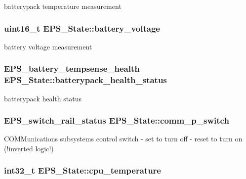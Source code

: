 batterypack temperature measurement \hypertarget{struct_e_p_s___state_a991b8e87396c3a76e3920115c165cf21}{
\subsubsection[{battery\-\_\-voltage}]{\setlength{\rightskip}{0pt plus 5cm}uint16\-\_\-t E\-P\-S\-\_\-\-State\-::battery\-\_\-voltage}}\label{struct_e_p_s___state_a991b8e87396c3a76e3920115c165cf21}
battery voltage measurement \hypertarget{struct_e_p_s___state_a8b34854a3d12dc7e7c705feb0074de76}{
\subsubsection[{batterypack\-\_\-health\-\_\-status}]{\setlength{\rightskip}{0pt plus 5cm}E\-P\-S\-\_\-battery\-\_\-tempsense\-\_\-health E\-P\-S\-\_\-\-State\-::batterypack\-\_\-health\-\_\-status}}\label{struct_e_p_s___state_a8b34854a3d12dc7e7c705feb0074de76}
batterypack health status \hypertarget{struct_e_p_s___state_addeb967b965af8a5784569eab567214c}{
\subsubsection[{comm\-\_\-p\-\_\-switch}]{\setlength{\rightskip}{0pt plus 5cm}E\-P\-S\-\_\-switch\-\_\-rail\-\_\-status E\-P\-S\-\_\-\-State\-::comm\-\_\-p\-\_\-switch}}\label{struct_e_p_s___state_addeb967b965af8a5784569eab567214c}
C\-O\-M\-Munications subsystems control switch -\/ set to turn off -\/ reset to turn on (!inverted logic!) \hypertarget{struct_e_p_s___state_a2f7dfc508a66740a64a25fda4dd8a503}{
\subsubsection[{cpu\-\_\-temperature}]{\setlength{\rightskip}{0pt plus 5cm}int32\-\_\-t E\-P\-S\-\_\-\-State\-::cpu\-\_\-temperature}}\label{struct_e_p_s___state_a2f7dfc508a66740a64a25fda4dd8a503}
